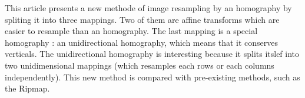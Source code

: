 This article presents a new methode of image resampling by an homography by spliting it into three mappings. Two of them are affine transforms which are easier to resample than an homography. The last mapping is a special homography : an unidirectional homography, which means that it conserves verticals. The unidirectional homography is interesting because it splits itslef into two unidimensional mappings (which resamples each rows or each columns independently). This new method is compared with pre-existing methods, such as the Ripmap.






